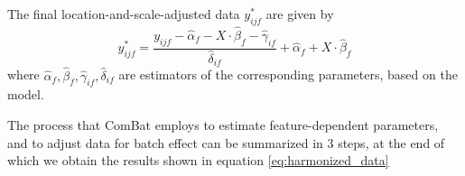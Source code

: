 \documentclass[11pt]{report}
\begin{document}
The final location-and-scale-adjusted data $y^{\ast}_{ijf}$ are given by
\begin{equation}\label{eq:harmonized_data}
y^{\ast}_{ijf} = \frac{y_{ijf} - \hat \alpha_f - X\cdot \hat \beta_f - \hat \gamma_{if}}{\hat \delta_{if}} + \hat \alpha_f + X \cdot \hat \beta_{f}
\end{equation}
where $\hat \alpha_f , \hat \beta_f , \hat \gamma_{if} ,  \hat \delta_{if}$ are estimators of the corresponding parameters, based on the model.


The process that ComBat employs to estimate feature-dependent parameters, and to adjust data for batch effect can be summarized in 3 steps, at the end of which we obtain the results shown in equation \ref{eq:harmonized_data}
\end{document}
